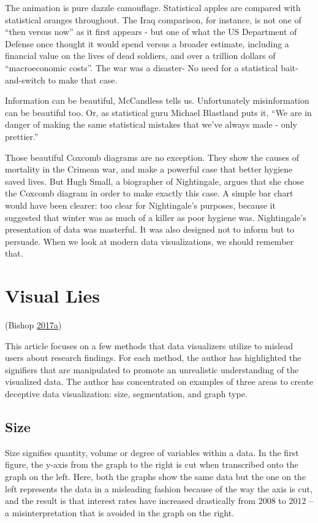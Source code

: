 \documentclass[]{book}
\theoremstyle{definition}
\theoremstyle{definition}
\theoremstyle{definition}
\theoremstyle{remark}
\begin{document}
The animation is pure dazzle camouflage. Statistical apples are compared
with statistical oranges throughout. The Iraq comparison, for instance,
is not one of ``then versus now'' as it first appears - but one of what
the US Department of Defense once thought it would spend versus a
broader estimate, including a financial value on the lives of dead
soldiers, and over a trillion dollars of ``macroeconomic costs''. The
war was a disaster- No need for a statistical bait-and-switch to make
that case.

Information can be beautiful, McCandless tells us. Unfortunately
misinformation can be beautiful too. Or, as statistical guru Michael
Blastland puts it, ``We are in danger of making the same statistical
mistakes that we've always made - only prettier.''

Those beautiful Coxcomb diagrams are no exception. They show the causes
of mortality in the Crimean war, and make a powerful case that better
hygiene saved lives. But Hugh Small, a biographer of Nightingale, argues
that she chose the Coxcomb diagram in order to make exactly this case. A
simple bar chart would have been clearer: too clear for Nightingale's
purposes, because it suggested that winter was as much of a killer as
poor hygiene was. Nightingale's presentation of data was masterful. It
was also designed not to inform but to persuade. When we look at modern
data visualizations, we should remember that.

\section{Visual Lies}\label{visual-lies}

(Bishop
\protect\hyperlink{ref-visual-lies}{2017}\protect\hyperlink{ref-visual-lies}{a})

This article focuses on a few methods that data visualizers utilize to
mislead users about research findings. For each method, the author has
highlighted the signifiers that are manipulated to promote an
unrealistic understanding of the visualized data. The author has
concentrated on examples of three areas to create deceptive data
visualization: size, segmentation, and graph type.

\subsection{Size}\label{size}

Size signifies quantity, volume or degree of variables within a data. In
the first figure, the y-axis from the graph to the right is cut when
transcribed onto the graph on the left. Here, both the graphs show the
same data but the one on the left represents the data in a misleading
fashion because of the way the axis is cut, and the result is that
interest rates have increased drastically from 2008 to 2012 -- a
misinterpretation that is avoided in the graph on the right.
\end{document}
